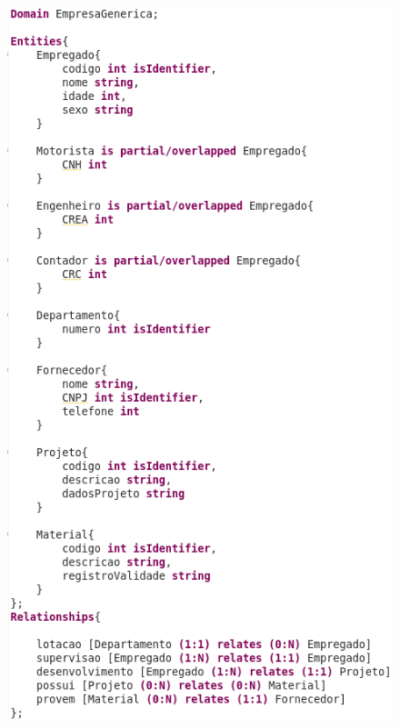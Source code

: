 \begin{figure}[!htb]
    \centering
    \includegraphics[scale=0.5]{postextuais/appendix/ExampleSubject-ERtext.png}
    \label{fig:my_label}
\end{figure}